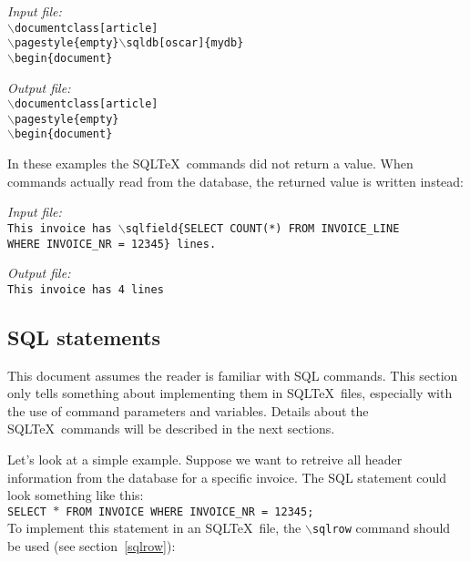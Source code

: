 \documentclass{article}
\newcommand{\bs}{\ensuremath{\backslash}}
\newcommand{\vs}{\vspace{3mm}}
\begin{document}
\begin{minipage}[t]{0.5\textwidth}\textsl{Input file:}\\\texttt{\footnotesize{\bs documentclass[article] \\
\bs pagestyle\{empty\}\bs sqldb[oscar]\{mydb\} \\
\bs begin\{document\} \\
\hrulefill}}\end{minipage}\hfill\begin{minipage}[t]{0.5\textwidth}\textsl{Output file:}\\\texttt{\footnotesize{\bs documentclass[article] \\
\bs pagestyle\{empty\} \\
\bs begin\{document\} \\
}}\end{minipage}

\vs

In these examples the SQL\TeX\ commands did not return a value. When commands actually read from
the database, the returned value is written instead:

\vs

\begin{minipage}[t]{0.5\textwidth}\textsl{Input file:}\\\texttt{\footnotesize{This invoice has \bs sqlfield\{SELECT COUNT(*) FROM INVOICE\_LINE \\
WHERE INVOICE\_NR = 12345\} lines.\\
\hrulefill}}\end{minipage}\hfill\begin{minipage}[t]{0.5\textwidth}\textsl{Output file:}\\\texttt{\footnotesize{This invoice has 4 lines \\
}}\end{minipage}

\subsection{SQL statements}\label{sqlstatements}

This document assumes the reader is familiar with SQL commands. This section only tells something about
implementing them in SQL\TeX\ files, especially with the use of command parameters and variables.
Details about the SQL\TeX\ commands will be described in the next sections.

\vs

Let's look at a simple example. Suppose we want to retreive all header information from the database
for a specific invoice. The SQL statement could look something like this: \\
\texttt{SELECT $\ast$ FROM INVOICE WHERE INVOICE\_NR = 12345;}\\
To implement this statement in an SQL\TeX\ file, the \texttt{\bs sqlrow} command should be used (see
section~\ref{sqlrow}):
\end{document}
